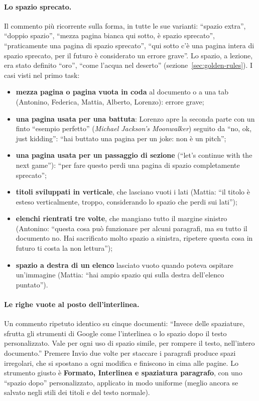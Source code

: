 \paragraph{Lo spazio sprecato.} Il commento più ricorrente sulla forma, in
tutte le sue varianti: ``spazio extra'', ``doppio spazio'', ``mezza pagina
bianca qui sotto, è spazio sprecato'', ``praticamente una pagina di spazio
sprecato'', ``qui sotto c'è una pagina intera di spazio sprecato, per il
futuro è considerato un errore grave''. Lo spazio, a lezione, era stato
definito ``oro'', ``come l'acqua nel deserto'' (sezione~\ref{sec:golden-rules}).
I casi visti nel primo task:
\begin{itemize}
  \item \textbf{mezza pagina o pagina vuota in coda} al documento o a una
        tab (Antonino, Federica, Mattia, Alberto, Lorenzo): errore grave;
  \item \textbf{una pagina usata per una battuta}: Lorenzo apre la seconda
        parte con un finto ``esempio perfetto'' (\emph{Michael Jackson's
        Moonwalker}) seguito da ``no, ok, just kidding'': ``hai buttato una
        pagina per un joke: non è un pitch'';
  \item \textbf{una pagina usata per un passaggio di sezione} (``let's
        continue with the next game''): ``per fare questo perdi una pagina di
        spazio completamente sprecato'';
  \item \textbf{titoli sviluppati in verticale}, che lasciano vuoti i lati
        (Mattia: ``il titolo è esteso verticalmente, troppo, considerando lo
        spazio che perdi sui lati'');
  \item \textbf{elenchi rientrati tre volte}, che mangiano tutto il margine
        sinistro (Antonino: ``questa cosa può funzionare per alcuni
        paragrafi, ma su tutto il documento no. Hai sacrificato molto spazio
        a sinistra, ripetere questa cosa in futuro ti costa la non
        lettura'');
  \item \textbf{spazio a destra di un elenco} lasciato vuoto quando poteva
        ospitare un'immagine (Mattia: ``hai ampio spazio qui sulla destra
        dell'elenco puntato'').
\end{itemize}

\paragraph{Le righe vuote al posto dell'interlinea.} Un commento ripetuto
identico su cinque documenti: ``Invece delle spaziature, sfrutta gli strumenti
di Google come l'interlinea o lo spazio dopo il testo personalizzato. Vale per
ogni uso di spazio simile, per rompere il testo, nell'intero documento.''
Premere Invio due volte per staccare i paragrafi produce spazi irregolari,
che si spostano a ogni modifica e finiscono in cima alle pagine. Lo strumento
giusto è \textbf{Formato, Interlinea e spaziatura paragrafo}, con uno
``spazio dopo'' personalizzato, applicato in modo uniforme (meglio ancora se
salvato negli stili dei titoli e del testo normale).

